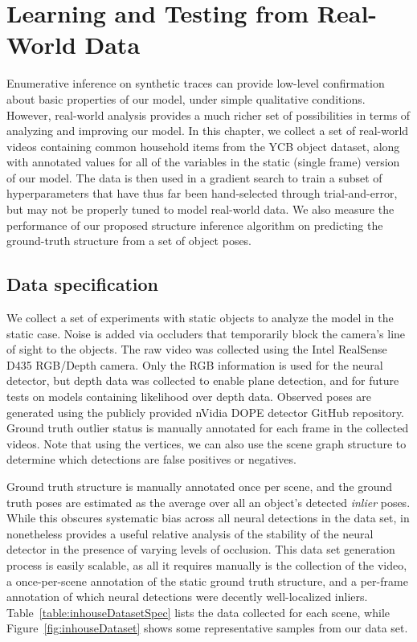 \chapter{Learning and Testing from Real-World Data} \label{chap:5}
Enumerative inference on synthetic traces can provide low-level confirmation about basic properties of our model, under simple qualitative conditions.
However, real-world analysis provides a much richer set of possibilities in terms of analyzing and improving our model.
In this chapter, we collect a set of real-world videos containing common household items from the YCB object dataset, along with annotated values for all of the variables in the static (single frame) version of our model.
The data is then used in a gradient search to train a subset of hyperparameters that have thus far been hand-selected through trial-and-error, but may not be properly tuned to model real-world data.
We also measure the performance of our proposed structure inference algorithm on predicting the ground-truth structure from a set of object poses.

\section{Data specification}
We collect a set of experiments with static objects to analyze the model in the static case.
Noise is added via occluders that temporarily block the camera's line of sight to the objects.
The raw video was collected using the Intel RealSense D435 RGB/Depth camera.
Only the RGB information is used for the neural detector, but depth data was collected to enable plane detection, and for future tests on models containing likelihood over depth data.
Observed poses are generated using the publicly provided nVidia DOPE detector GitHub repository.
Ground truth outlier status is manually annotated for each frame in the collected videos.
Note that using the vertices, we can also use the scene graph structure to determine which detections are false positives or negatives.

Ground truth structure is manually annotated once per scene, and the ground truth poses are estimated as the average over all an object's detected \textit{inlier} poses.
While this obscures systematic bias across all neural detections in the data set, in nonetheless provides a useful relative analysis of the stability of the neural detector in the presence of varying levels of occlusion.
This data set generation process is easily scalable, as all it requires manually is the collection of the video, a once-per-scene annotation of the static ground truth structure, and a per-frame annotation of which neural detections were decently well-localized inliers.
Table~\ref{table:inhouseDatasetSpec} lists the data collected for each scene, while Figure~\ref{fig:inhouseDataset} shows some representative samples from our data set.

